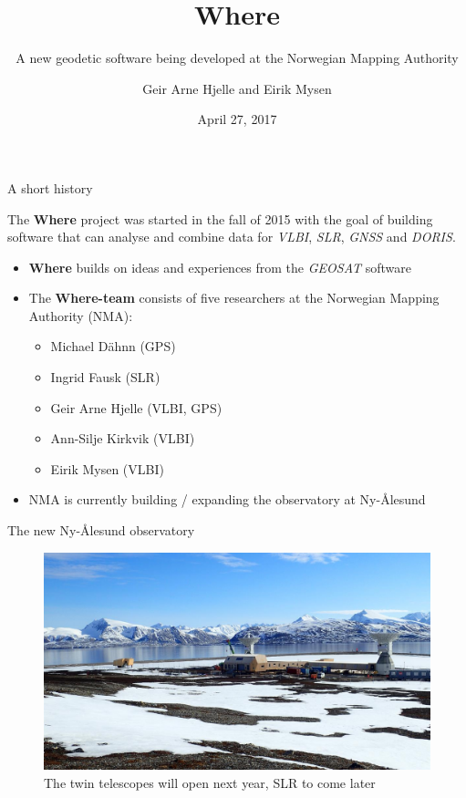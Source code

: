 \documentclass[ignorenonframetext,12pt,t]{beamer}
\title{Where}
\subtitle{A new geodetic software being developed at the Norwegian Mapping
Authority}
\author{Geir Arne Hjelle and Eirik Mysen}
\date{April 27, 2017}
\providecommand{\tightlist}{%
  \setlength{\itemsep}{0pt}\setlength{\parskip}{0pt}}
\begin{document}
\frame{\titlepage}

\begin{frame}{A short history}

The \textbf{Where} project was started in the fall of 2015 with the goal
of building software that can analyse and combine data for \emph{VLBI},
\emph{SLR}, \emph{GNSS} and \emph{DORIS}.

\begin{itemize}
\item
  \textbf{Where} builds on ideas and experiences from the \emph{GEOSAT}
  software
\item
  The \textbf{Where-team} consists of five researchers at the Norwegian
  Mapping Authority (NMA):

  \begin{itemize}
  \tightlist
  \item
    Michael Dähnn (GPS)
  \item
    Ingrid Fausk (SLR)
  \item
    Geir Arne Hjelle (VLBI, GPS)
  \item
    Ann-Silje Kirkvik (VLBI)
  \item
    Eirik Mysen (VLBI)
  \end{itemize}
\item
  NMA is currently building / expanding the observatory at Ny-Ålesund
\end{itemize}

\end{frame}

\begin{frame}{The new Ny-Ålesund observatory}

\begin{figure}
\centering
\includegraphics{nyal_antennas.jpg}
\caption{The twin telescopes will open next year, SLR to come later}
\end{figure}

\end{frame}
\end{document}
